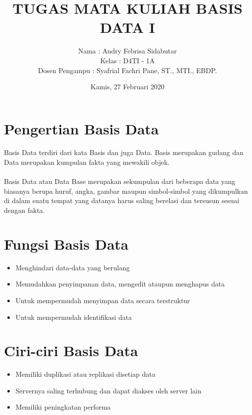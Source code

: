 \documentclass{article}
\title{TUGAS MATA KULIAH BASIS DATA I}
\author{Nama : Audry Febrisa Sidabutar \\ Kelas : D4TI - 1A \\ Dosen Pengampu :  Syafrial Fachri Pane, ST., MTI., EBDP.}
\date{Kamis, 27 Februari 2020}
\begin{document}
\maketitle
\section{Pengertian Basis Data}
\paragraph{}
Basis Data terdiri dari kata Basis dan juga Data. Basis merupakan gudang dan Data merupakan kumpulan fakta yang mewakili objek.
\paragraph{}
Basis Data atau Data Base merupakan sekumpulan dari beberapa data yang biasanya berupa huruf, angka, gambar maupun simbol-simbol yang dikumpulkan di dalam suatu tempat yang datanya harus saling berelasi dan tersusun sesuai dengan fakta.

\section{Fungsi Basis Data}
\begin{itemize}
    \item Menghindari data-data yang berulang
    \item Memudahkan penyimpanan data, mengedit ataupun menghapus data
    \item Untuk mempermudah menyimpan data secara terstruktur
    \item Untuk mempermudah identifikasi data
\end{itemize}{}

\newpage
\section{Ciri-ciri Basis Data}
\begin{itemize}
    \item Memiliki duplikasi atau replikasi disetiap data
    \item Servernya saling terhubung dan dapat diakses oleh server lain
    \item Memiliki peningkatan performa
\end{itemize}{}
\end{document}
